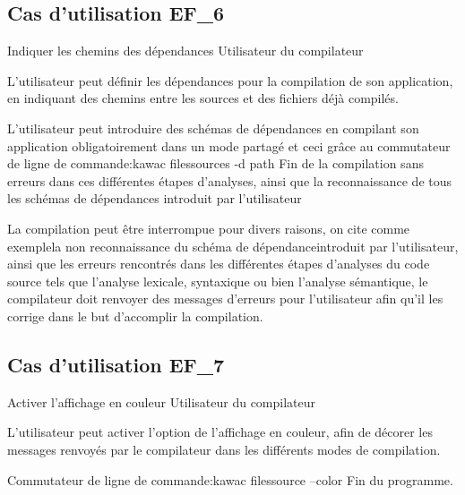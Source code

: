 \subsection{Cas d'utilisation EF\_6}
\fiche
{Indiquer les chemins des dépendances}          %
{Utilisateur du compilateur}                               %
{                                                %
   
L'utilisateur peut définir les dépendances pour la compilation de son application, en indiquant des chemins entre les sources et des fichiers déjà compilés.}
{
  
}                                                %
{ L'utilisateur peut introduire des schémas de dépendances en compilant son application obligatoirement dans un mode partagé et ceci grâce au commutateur de ligne de commande:kawac filessources -d path}                             %
{Fin de la compilation sans erreurs dans ces différentes étapes d'analyses, ainsi que la reconnaissance de tous les schémas de dépendances introduit par l'utilisateur}                       %
{                                                %
 
}{} %
{La compilation peut être interrompue pour divers raisons, on cite comme exemplela non reconnaissance du schéma de dépendanceintroduit par l'utilisateur, ainsi que les erreurs rencontrés dans les différentes étapes d'analyses du code source  tels que l'analyse lexicale, syntaxique ou bien l'analyse sémantique, le compilateur doit renvoyer des messages d'erreurs pour l'utilisateur afin qu'il les corrige dans le but d'accomplir la compilation.} %

\subsection{Cas d'utilisation EF\_7}
\fiche
{Activer l'affichage en couleur}          %
{Utilisateur du compilateur}                               %
{                                                %
   
  L'utilisateur peut activer l'option de l'affichage en couleur, afin de décorer les messages renvoyés par le compilateur dans les différents modes de compilation.   
}
{
  
}                                                %
{Commutateur de ligne de commande:kawac filessource --color}                             %
{Fin du programme.}                       %
{                                                %
 
}{} %
{} %
